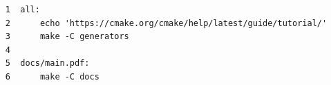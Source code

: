 \begin{verbatim}
     1	all:
     2		echo 'https://cmake.org/cmake/help/latest/guide/tutorial/'
     3		make -C generators
     4	
     5	docs/main.pdf:
     6		make -C docs
\end{verbatim}

